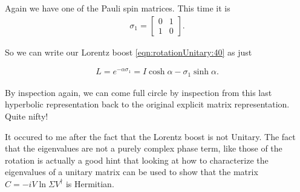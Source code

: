 Again we have one of the Pauli spin matrices.  This time it is
\begin{align}\label{eqn:rotationUnitary:42}
\sigma_1 =
\begin{bmatrix}
0 & 1 \\
1 & 0
\end{bmatrix}.
\end{align}

So we can write our Lorentz boost \ref{eqn:rotationUnitary:40} as just

\begin{align}\label{eqn:rotationUnitary:43}
L = e^{-\alpha \sigma_1} = I \cosh\alpha - \sigma_1 \sinh\alpha.
\end{align}

By inspection again, we can come full circle by inspection from this last hyperbolic representation back to the original explicit matrix representation.  Quite nifty!

It occured to me after the fact that the Lorentz boost is not Unitary.  The fact that the eigenvalues are not a purely complex phase term, like those of the rotation is actually a good hint that looking at how to characterize the eigenvalues of a unitary matrix can be used to show that the matrix $C = -i V \ln \Sigma V^\dagger$ is Hermitian.

\EndArticle
